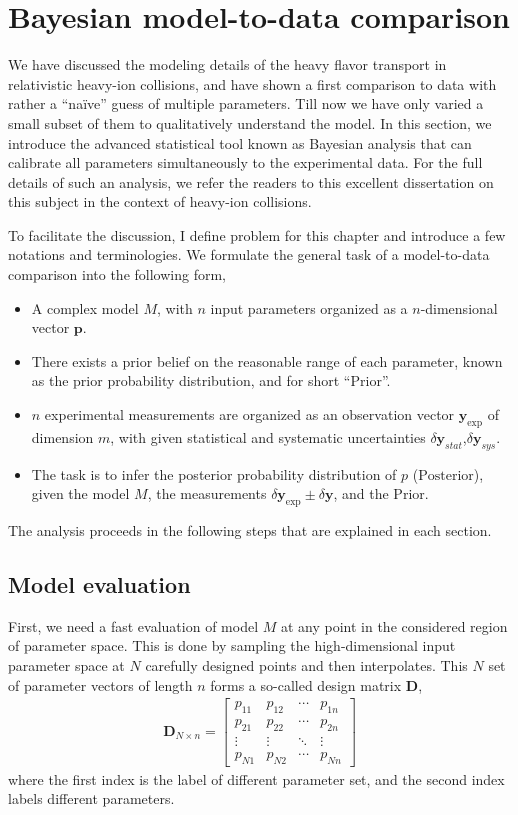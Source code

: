 \chapter{Bayesian model-to-data comparison}
\label{chapter:bayes}
We have discussed the modeling details of the heavy flavor transport in relativistic heavy-ion collisions, and have shown a first comparison to data with rather a ``na\"ive'' guess of multiple parameters.
Till now we have only varied a small subset of them to qualitatively understand the model.
In this section, we introduce the advanced statistical tool known as Bayesian analysis that can calibrate all parameters simultaneously to the experimental data.
For the full details of such an analysis, we refer the readers to this excellent dissertation on this subject \cite{Bernhard:2018hnz} in the context of heavy-ion collisions.

To facilitate the discussion, I define problem for this chapter and introduce a few notations and terminologies.
We formulate the general task of a model-to-data comparison into the following form,
\begin{itemize}
\item A complex model $M$, with $n$ input parameters organized as a $n$-dimensional vector $\mathbf{p}$.
\item There exists a prior belief on the reasonable range of each parameter, known as the prior probability distribution, and for short ``$\mathrm{Prior}$''.
\item $n$ experimental measurements are organized as an observation vector $\mathbf{y}_{\exp}$ of dimension $m$, with given statistical and systematic uncertainties $\delta\mathbf{y}_{stat}$,$\delta\mathbf{y}_{sys}$.
\item The task is to infer the posterior probability distribution of $p$ ($\mathrm{Posterior}$), given the model $M$, the measurements $\delta\mathbf{y}_{\exp}\pm \delta \mathbf{y}$, and the $\mathrm{Prior}$.
\end{itemize}
The analysis proceeds in the following steps that are explained in each section.

\section{Model evaluation}
First, we need a fast evaluation of model $M$ at any point in the considered region of parameter space.
This is done by sampling the high-dimensional input parameter space at $N$ carefully designed points and then interpolates.
This $N$ set of parameter vectors of length $n$ forms a so-called design matrix $\mathbf{D}$,
\begin{eqnarray}
\mathbf{D}_{N\times n} = 
\begin{bmatrix}
p_{11} & p_{12} & \cdots & p_{1n}\\
p_{21} & p_{22} & \cdots & p_{2n}\\
\vdots & \vdots & \ddots & \vdots \\
p_{N1} & p_{N2} & \cdots & p_{Nn}
\end{bmatrix}
\end{eqnarray}
where the first index is the label of different parameter set, and the second index labels different parameters.

